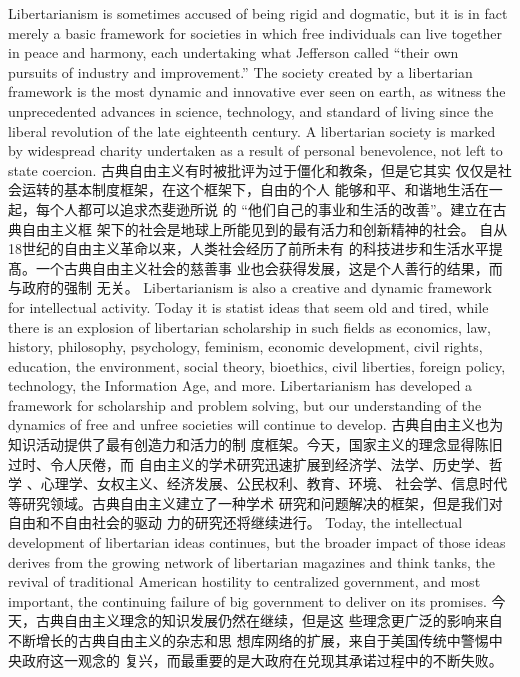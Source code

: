 \begin{paracol}{2}
Libertarianism is sometimes accused of being rigid and dogmatic, but it is in fact merely a basic framework for societies in
which free individuals can live together in peace and harmony,
each undertaking what Jefferson called ``their own pursuits of
industry and improvement.'' The society created by a libertarian framework is the most dynamic and innovative ever seen on
earth, as witness the unprecedented advances in science, technology, and standard of living since the liberal revolution of the
late eighteenth century. A libertarian society is marked by
widespread charity undertaken as a result of personal benevolence, not left to state coercion.
\switchcolumn
古典自由主义有时被批评为过于僵化和教条，但是它其实
仅仅是社会运转的基本制度框架，在这个框架下，自由的个人
能够和平、和谐地生活在一起，每个人都可以追求杰斐逊所说
的 “他们自己的事业和生活的改善”。建立在古典自由主义框
架下的社会是地球上所能见到的最有活力和创新精神的社会。
自从18世纪的自由主义革命以来，人类社会经历了前所未有
的科技进步和生活水平提髙。一个古典自由主义社会的慈善事
业也会获得发展，这是个人善行的结果，而与政府的强制
无关。
\switchcolumn*
Libertarianism is also a creative and dynamic framework for
intellectual activity. Today it is statist ideas that seem old and
tired, while there is an explosion of libertarian scholarship in
such fields as economics, law, history, philosophy, psychology,
feminism, economic development, civil rights, education, the
environment, social theory, bioethics, civil liberties, foreign policy, technology, the Information Age, and more. Libertarianism
has developed a framework for scholarship and problem solving, but our understanding of the dynamics of free and unfree
societies will continue to develop.
\switchcolumn
古典自由主义也为知识活动提供了最有创造力和活力的制
度框架。今天，国家主义的理念显得陈旧过时、令人厌倦，而
自由主义的学术研究迅速扩展到经济学、法学、历史学、哲
学 、心理学、女权主义、经济发展、公民权利、教育、环境、
社会学、信息时代等研究领域。古典自由主义建立了一种学术
研究和问题解决的框架，但是我们对自由和不自由社会的驱动
力的研究还将继续进行。
\switchcolumn*
Today, the intellectual development of libertarian ideas continues, but the broader impact of those ideas derives from the
growing network of libertarian magazines and think tanks, the
revival of traditional American hostility to centralized government, and most important, the continuing failure of big government to deliver on its promises.
\switchcolumn
今天，古典自由主义理念的知识发展仍然在继续，但是这
些理念更广泛的影响来自不断增长的古典自由主义的杂志和思
想库网络的扩展，来自于美国传统中警惕中央政府这一观念的
复兴，而最重要的是大政府在兑现其承诺过程中的不断失败。

\end{paracol}